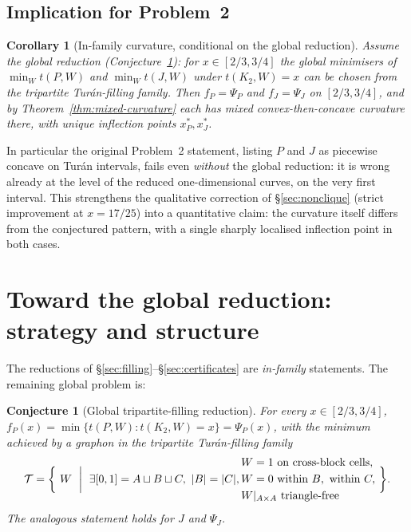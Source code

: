 \documentclass[11pt]{amsart}
\newtheorem{conjecture}[theorem]{Conjecture}
\newtheorem{corollary}[theorem]{Corollary}
\theoremstyle{definition}
\newcommand{\1}{\mathbf 1}
\begin{document}
\subsection{Implication for Problem~2}

\begin{corollary}[In-family curvature, conditional on the global reduction]
\label{cor:infamily-curvature}
Assume the global reduction (Conjecture~\ref{conj:global-reduction}): for
$x\in[2/3,3/4]$ the global minimisers of $\min_W t(P,W)$ and $\min_W t(J,W)$
under $t(K_2,W)=x$ can be chosen from the tripartite Tur\'an-filling family.
Then $f_P=\Psi_P$ and $f_J=\Psi_J$ on $[2/3,3/4]$, and by
Theorem~\ref{thm:mixed-curvature} each has mixed convex-then-concave curvature
there, with unique inflection points $x^*_P,x^*_J$.
\end{corollary}

In particular the original Problem~2 statement, listing $P$ and $J$ as piecewise
concave on Tur\'an intervals, fails even \emph{without} the global reduction: it
is wrong already at the level of the reduced one-dimensional curves, on the very
first interval.  This strengthens the qualitative correction of
\S\ref{sec:nonclique} (strict improvement at $x=17/25$) into a quantitative
claim: the curvature itself differs from the conjectured pattern, with a single
sharply localised inflection point in both cases.

\section{Toward the global reduction: strategy and structure}
\label{sec:global}

The reductions of \S\ref{sec:filling}--\S\ref{sec:certificates} are
\emph{in-family} statements.  The remaining global problem is:

\begin{conjecture}[Global tripartite-filling reduction]
\label{conj:global-reduction}
For every $x\in[2/3,3/4]$, $f_P(x)=\min\{t(P,W):t(K_2,W)=x\}=\Psi_P(x)$, with the
minimum achieved by a graphon in the tripartite Tur\'an-filling family
\[
   \mathcal T = \biggl\{\ W\ \biggm|\ \exists [0,1] = A\sqcup B\sqcup C,\ |B|=|C|,
   \begin{aligned}
   &W=1\ \text{on cross-block cells},\\
   &W=0\ \text{within }B,\ \text{within }C,\\
   &W|_{A\times A}\ \text{triangle-free}
   \end{aligned}\ \biggr\}.
\]
The analogous statement holds for $J$ and $\Psi_J$.
\end{conjecture}
\end{document}
